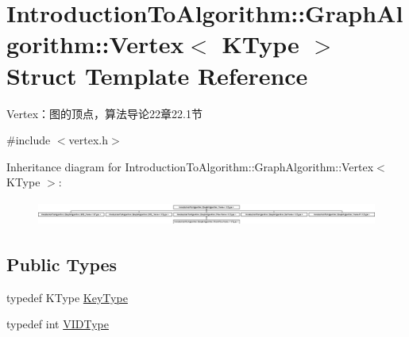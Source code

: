 \hypertarget{struct_introduction_to_algorithm_1_1_graph_algorithm_1_1_vertex}{}\section{Introduction\+To\+Algorithm\+:\+:Graph\+Algorithm\+:\+:Vertex$<$ K\+Type $>$ Struct Template Reference}
\label{struct_introduction_to_algorithm_1_1_graph_algorithm_1_1_vertex}


Vertex：图的顶点，算法导论22章22.1节  




{\ttfamily \#include $<$vertex.\+h$>$}

Inheritance diagram for Introduction\+To\+Algorithm\+:\+:Graph\+Algorithm\+:\+:Vertex$<$ K\+Type $>$\+:\begin{figure}[H]
\begin{center}
\leavevmode
\includegraphics[height=0.825553cm]{struct_introduction_to_algorithm_1_1_graph_algorithm_1_1_vertex}
\end{center}
\end{figure}
\subsection*{Public Types}
\begin{DoxyCompactItemize}
\item 
typedef K\+Type \hyperlink{struct_introduction_to_algorithm_1_1_graph_algorithm_1_1_vertex_a14e958c58a404474853491eb811954cc}{Key\+Type}
\item 
typedef int \hyperlink{struct_introduction_to_algorithm_1_1_graph_algorithm_1_1_vertex_a290c84c0dcf159f833c72c47a2d4d44a}{V\+I\+D\+Type}
\end{DoxyCompactItemize}
